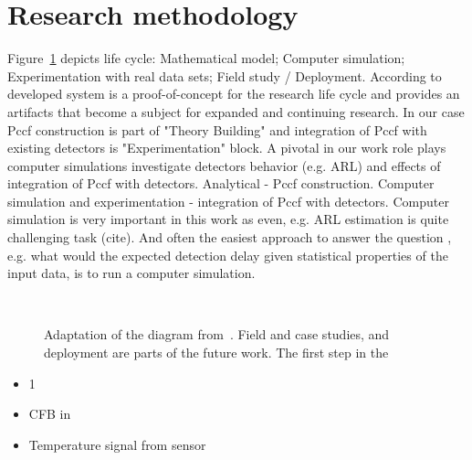 \section{Research methodology}

Figure~\ref{fig:methodology} depicts life cycle: Mathematical model; Computer simulation; Experimentation with real data sets; Field study / Deployment.
According to~\cite{nunamaker1990systems} developed system is a proof-of-concept for the research life cycle and provides an artifacts that become a subject for expanded and continuing research.
In our case Pccf construction is part of "Theory Building" and integration of Pccf with existing detectors is "Experimentation" block.
A pivotal in our work role plays computer simulations investigate detectors behavior (e.g. ARL) and effects of integration of Pccf with detectors.
Analytical - Pccf construction.
Computer simulation and experimentation - integration of Pccf with detectors.
Computer simulation is very important in this work as even, e.g. ARL estimation is quite challenging task (cite).
And often the easiest approach to answer the question , e.g. what would the expected detection delay given statistical properties of the input data, is to run a computer simulation. 

\begin{figure}[htb!]
\centering

  \caption{Adaptation of the diagram from~\cite{nunamaker1990systems}. Field and case studies, and deployment are parts of the future work. The first step in the }
  ~\label{fig:methodology}
\end{figure}

\begin{itemize}
  \item 1
  \item CFB in~\cite{x}
  \item Temperature signal from sensor
\end{itemize}

